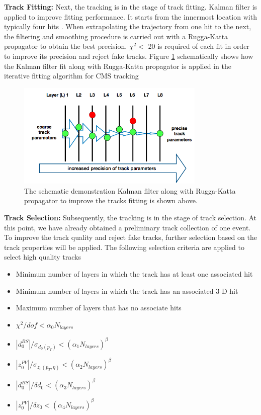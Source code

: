 \textbf{Track Fitting:} Next, the tracking is in the stage of track fitting. Kalman filter \cite{Kalman} is applied to improve fitting performance. It starts from the innermost location with typically four hits \cite{CMSTrack1,CMSTrack2,CMSTrack3}. When extrapolating the trajectory from one hit to the next, the filtering and smoothing procedure is carried out with a Rugga-Katta propagator to obtain the best precision. $\chi^2 < $ 20 is required of each fit in order to improve its precision and reject fake tracks. Figure \ref{KalmanFitting} schematically shows how the Kalman filter fit along with Rugga-Katta propagator is applied in the iterative fitting algorithm for CMS tracking


\begin{figure}[hbtp]
\begin{center}
\includegraphics[width=0.80\textwidth]{Figures/Chapter4/KalmanFitting.png}
\caption{The schematic demonstration Kalman filter along with Rugga-Katta propagator to improve the tracks fitting is shown above.}
\label{KalmanFitting}
\end{center}
\end{figure} 


\textbf{Track Selection:} Subsequently, the tracking is in the stage of track selection. At this point, we have already obtained a preliminary track collection of one event. To improve the track quality and reject fake tracks, further selection based on the track properties will be applied. The following selection criteria are applied to select high quality tracks \cite{CMSTrackComp}

\begin{itemize}
\item Minimum number of layers in which the track has at least one associated hit
\item Minimum number of layers in which the track has an associated 3-D hit
\item Maximum number of layers that has no associate hits
\item $\chi^2/dof < \alpha_0 N_{layers}$ 
\item $|d_0^{BS}|/ \sigma_{d_0(p_T)} < (\alpha_1 N_{layers})^\beta$ 
\item $|z_0^{PV}|/ \sigma_{z_0(p_T,\eta)}  < (\alpha_2 N_{layers})^\beta$ 
\item $|d_0^{BS}|/\delta d_0 < (\alpha_3 N_{layers})^\beta$ 
\item $|z_0^{PV}|/\delta z_0 < (\alpha_4 N_{layers})^\beta$ 
\end{itemize}

